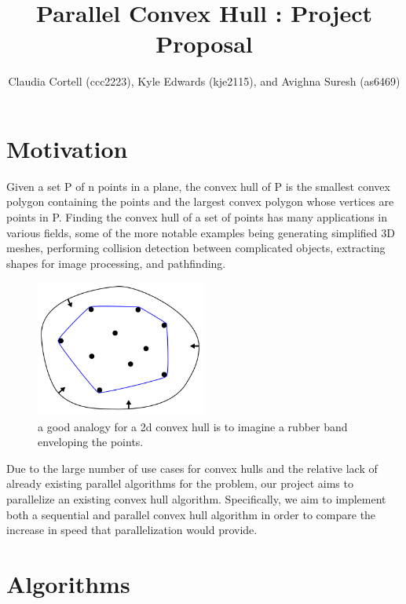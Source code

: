 \documentclass[12pt]{article}
\author{Claudia Cortell (ccc2223), Kyle Edwards (kje2115), and Avighna Suresh (as6469)}
\title{Parallel Convex Hull : Project Proposal}
\begin{document}
\maketitle

\setcounter{section}{0}

\section{Motivation}


Given a set P of n points in a plane, the convex hull of P is the smallest convex polygon containing the points and the largest convex polygon whose vertices are points in P. Finding the convex hull of a set of points has many applications in various fields, some of the more notable examples being generating simplified 3D meshes, performing collision detection between complicated objects, extracting shapes for image processing, and pathfinding. 

\begin{figure}[h]
  \centering
  \includegraphics[width=0.5\textwidth]{convex_hull.png}
  \caption{a good analogy for a 2d convex hull is to imagine a rubber band
  enveloping the points.}
\end{figure}

Due to the large number of use cases for convex hulls and the relative lack of already existing parallel algorithms for the problem, our project aims to parallelize an existing convex hull algorithm. Specifically, we aim to implement both a sequential and parallel convex hull algorithm in order to compare the increase in speed that parallelization would provide.

\section{Algorithms}
\end{document}
